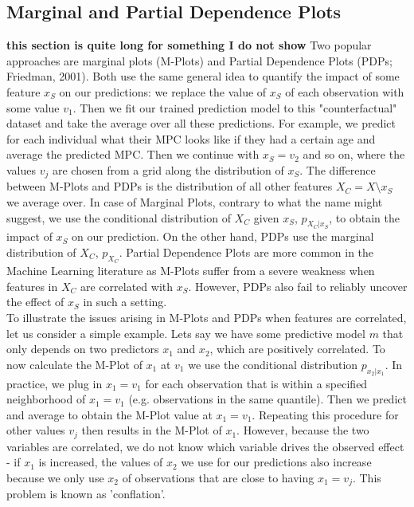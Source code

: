 \subsection{Marginal and Partial Dependence Plots}
\textbf{this section is quite long for something I do not show}
Two popular approaches are marginal plots (M-Plots) and Partial Dependence Plots (PDPs; Friedman, 2001). Both use the same general idea to quantify the impact of some feature $x_S$ on our predictions: we replace the value of $x_S$ of each observation with some value $v_1$. Then we fit our trained prediction model to this "counterfactual" dataset and take the average over all these predictions. For example, we predict for each individual what their MPC looks like if they had a certain age and average the predicted MPC. Then we continue with $x_S=v_2$ and so on, where the values $v_j$ are chosen from a grid along the distribution of $x_S$. The difference between M-Plots and PDPs is the distribution of all other features $X_C=X\setminus x_S$ we average over. In case of Marginal Plots, contrary to what the name might suggest, we use the conditional distribution of $X_C$ given $x_S$, $p_{X_C|x_S}$, to obtain the impact of $x_S$ on our prediction. On the other hand, PDPs use the marginal distribution of $X_C$, $p_{X_C}$. 
Partial Dependence Plots are more common in the Machine Learning literature as M-Plots suffer from a severe weakness when features in $X_C$ are correlated with $x_S$. However, PDPs also fail to reliably uncover the effect of $x_S$ in such a setting. \\
To illustrate the issues arising in M-Plots and PDPs when features are correlated, let us consider a simple example. Lets say we have some predictive model $m$ that only depends on two predictors $x_1$ and $x_2$, which are positively correlated. To now calculate the M-Plot of $x_1$ at $v_1$ we use the conditional distribution $p_{x_2|x_1}$. In practice, we plug in $x_1=v_1$ for each observation that is within a specified neighborhood of $x_1=v_1$ (e.g. observations in the same quantile). Then we predict and average to obtain the M-Plot value at $x_1=v_1$. Repeating this procedure for other values $v_j$ then results in the M-Plot of $x_1$. However, because the two variables are correlated, we do not know which variable drives the observed effect - if $x_1$  is increased, the values of $x_2$  we use for our predictions also increase because we only use $x_2$ of observations that are close to having $x_1=v_j$. This problem is known as 'conflation'. \\
